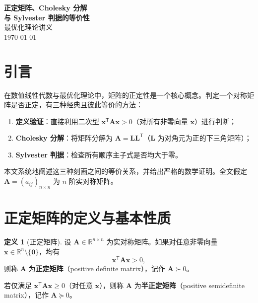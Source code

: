 \documentclass[12pt,a4paper]{article}
\theoremstyle{mystyle}
\theoremstyle{proofstyle}
\theoremstyle{definition}
\newtheorem{definition}[theorem]{定义}
\theoremstyle{remark}
\newcommand{\R}{\mathbb{R}}
\newcommand{\T}{^{\mathsf{T}}}
\newcommand{\x}{\mathbf{x}}
\newcommand{\A}{\mathbf{A}}
\newcommand{\Lmat}{\mathbf{L}}
\newcommand{\zero}{\mathbf{0}}
\begin{document}
\begin{center}
    \vspace*{2cm}
    {\Huge\bfseries 正定矩阵、Cholesky 分解\\[4pt] 与 Sylvester 判据的等价性}\\[1.5cm]
    {\LARGE 最优化理论讲义}\\[2cm]
    {\large \today}\\[1cm]
    \vfill
\end{center}

\newpage
\tableofcontents
\newpage

\section{引言}

在数值线性代数与最优化理论中，矩阵的正定性是一个核心概念。判定一个对称矩阵是否正定，有三种经典且彼此等价的方法：
\begin{enumerate}
    \item \textbf{定义验证}：直接利用二次型 $ \x\T\A\x > 0 $（对所有非零向量 $\x$）进行判断；
    \item \textbf{Cholesky 分解}：将矩阵分解为 $ \A = \Lmat\Lmat\T$（$\Lmat$ 为对角元为正的下三角矩阵）；
    \item \textbf{Sylvester 判据}：检查所有顺序主子式是否均大于零。
\end{enumerate}

本文系统地阐述这三种刻画之间的等价关系，并给出严格的数学证明。全文假定 $\A = (a_{ij})_{n\times n}$ 为 $n$ 阶实对称矩阵。

\section{正定矩阵的定义与基本性质}

\begin{definition}[正定矩阵]
设 $\A \in \R^{n\times n}$ 为实对称矩阵。如果对任意非零向量 $\x \in \R^n \setminus \{\zero\}$，均有
\begin{equation}\label{eq:pd-def}
    \x\T\A\x > 0,
\end{equation}
则称 $\A$ 为\textbf{正定矩阵}（positive definite matrix），记作 $\A \succ 0$。

若仅满足 $\x\T\A\x \ge 0$（对任意 $\x$），则称 $\A$ 为\textbf{半正定矩阵}（positive semidefinite matrix），记作 $\A \succeq 0$。
\end{definition}
\end{document}
